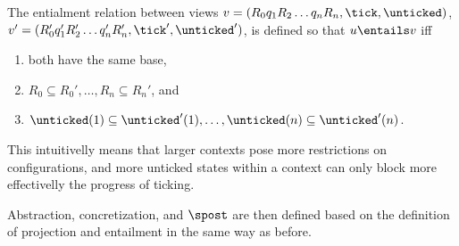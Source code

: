 The entialment relation between views 
$v = (R_0q_1R_2\ldots q_nR_{n},\tick,\unticked)$,
$v' = (R_0'q_1'R_2'\ldots q_n'R_{n}',\tick',\unticked')$,
is defined so that $u\entails v$ iff  
\begin{enumerate}
\item
both have the same base,
\item
$R_0\subseteq R_0',\ldots,R_n\subseteq R_n'$, and
\item
$\unticked(1)\subseteq \unticked'(1),\ldots,\unticked(n)\subseteq \unticked'(n)$.
\end{enumerate}
This intuitivelly means that larger contexts pose more restrictions on configurations, and more unticked states within a context can only block more effectivelly the progress of ticking.

%
Abstraction, concretization, and $\spost$ are then defined based on the definition of projection and entailment in the same way as before.


